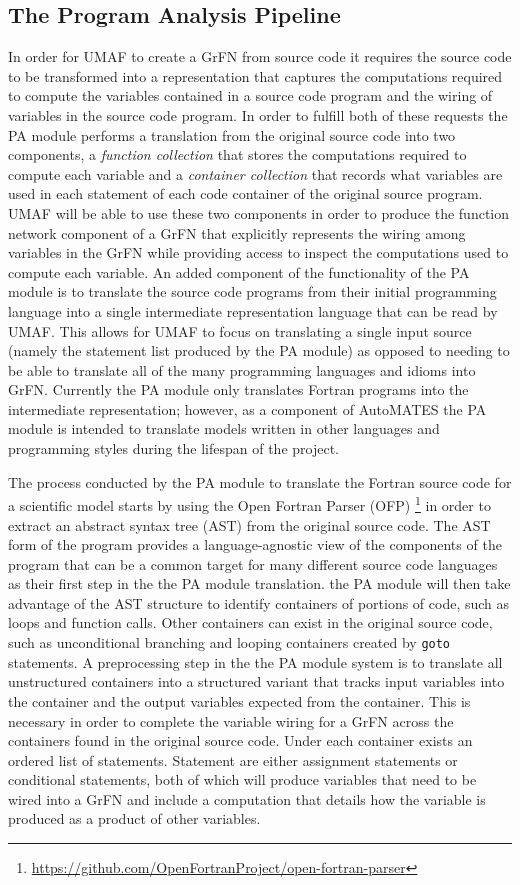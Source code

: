 \subsection{The Program Analysis Pipeline\label{sec:pa_overview}}
In order for UMAF to create a GrFN from source code it requires the source code to be transformed into a representation that captures the computations required to compute the variables contained in a source code program and the wiring of variables in the source code program.
In order to fulfill both of these requests the PA module performs a translation from the original source code into two components, a \textit{function collection} that stores the computations required to compute each variable and a \textit{container collection} that records what variables are used in each statement of each code container of the original source program.
UMAF will be able to use these two components in order to produce the function network component of a GrFN that explicitly represents the wiring among variables in the GrFN while providing access to inspect the computations used to compute each variable.
An added component of the functionality of the PA module is to translate the source code programs from their initial programming language into a single intermediate representation language that can be read by UMAF.
This allows for UMAF to focus on translating a single input source (namely the statement list produced by the PA module) as opposed to needing to be able to translate all of the many programming languages and idioms into GrFN.
Currently the PA module only translates Fortran programs into the intermediate representation; however, as a component of AutoMATES the PA module is intended to translate models written in other languages and programming styles during the lifespan of the project.

The process conducted by the PA module to translate the Fortran source code for a scientific model starts by using the Open Fortran Parser (OFP) \footnote{\url{https://github.com/OpenFortranProject/open-fortran-parser}} in order to extract an abstract syntax tree (AST) \citep{aho1986dragonBook} from the original source code.
The AST form of the program provides a language-agnostic view of the components of the program that can be a common target for many different source code languages as their first step in the the PA module translation.
the PA module will then take advantage of the AST structure to identify containers of portions of code, such as loops and function calls.
Other containers can exist in the original source code, such as unconditional branching and looping containers created by \texttt{goto} statements.
A preprocessing step in the the PA module system is to translate all unstructured containers into a structured variant that tracks input variables into the container and the output variables expected from the container.
This is necessary in order to complete the variable wiring for a GrFN across the containers found in the original source code.
Under each container exists an ordered list of statements.
Statement are either assignment statements or conditional statements, both of which will produce variables that need to be wired into a GrFN and include a computation that details how the variable is produced as a product of other variables.

